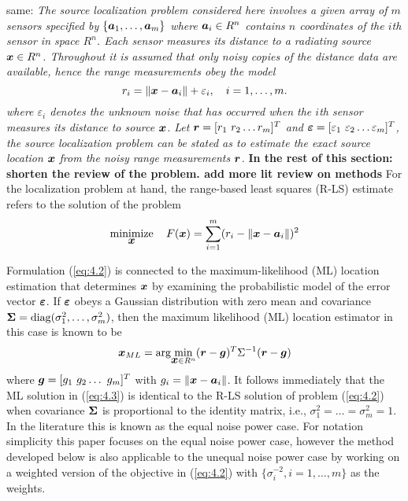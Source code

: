 same:
\emph{The source localization problem considered here involves a given array of $m$ sensors specified by $\{\mbox{\boldmath$a$}_1,\ldots, \mbox{\boldmath$a$}_m\}$ where $\mbox{\boldmath$a$}_i\in R^n$  contains  $n$ coordinates of the $i$th sensor in space $R^n$. Each sensor measures its distance to a radiating source $\mbox{\boldmath$x$}\in R^n$. Throughout it is assumed that only noisy copies of the distance data are available, hence the \textit{range measurements} obey the model
\begin{equation} \label{eq:4.1}
\setcounter{equation}{1}
r_i = \|{\Bx} - {\Ba}_i\| + \varepsilon_i, \quad i = 1, \ldots , m.
\end{equation}    
where $\varepsilon_i$ denotes the unknown noise that has occurred when the $i$th sensor measures its distance to source $\mbox{\boldmath$x$}$. Let $\mbox{\boldmath$r$}=[r_1 \ r_2 \ldots r_m]^T$ and $\mbox{\boldmath${\varepsilon}$}=[\varepsilon_1 \ \varepsilon_2 \ldots \varepsilon_m]^T$, the source localization problem can be stated as to estimate the exact source location $\mbox{\boldmath$x$}$ from the noisy range measurements $\mbox{\boldmath$r$}$. }
\textbf{In the rest of this section: shorten the review of the problem. add more lit review on methods}
For the localization problem at hand, the range-based least squares (R-LS) estimate refers to the solution of the problem
\begin{equation}\label{eq:4.2} %
\Min_{\Bx} \quad F(\Bx)=\sum_{i=1}^{m} (r_i - \|{\Bx} - {\Ba}_i\|)^2
\end{equation}

Formulation (\ref{eq:4.2}) is connected to the maximum-likelihood (ML) location estimation that determines $\mbox{\boldmath$x$}$ by examining the probabilistic model of the error vector $\mbox{\boldmath${\varepsilon}$}$. If $\mbox{\boldmath${\varepsilon}$}$ obeys a Gaussian distribution with zero mean and covariance $\mbox{\boldmath${\Sigma}$} = \mbox{diag}(\sigma_1^2, \ldots, \sigma_m^2)$, then the maximum likelihood (ML) location estimator in this case is known to be
\begin{equation} \label{eq:4.3}%
\Bx_{ML} = \mbox{arg}\!\min_{{\Bx} \in R^n} (\Br - \Bg)^T\Sigma^{-1}(\Br - \Bg)
\end{equation}
where $\mbox{\boldmath$g$} = [g_1 \ g_2 \ldots \ g_m]^T$ with $g_i = \|{\mbox{\boldmath$x$}} - {\mbox{\boldmath$a$}}_i\|$. It follows immediately that the ML solution in (\ref{eq:4.3}) is identical to the R-LS solution of problem (\ref{eq:4.2}) when covariance $\mbox{\boldmath${\Sigma}$}$ is proportional to the identity matrix, i.e., $\sigma_1^2=\ldots =\sigma_m^2 = 1$. In the literature this is known as the equal noise power case. For notation simplicity this paper focuses on the equal noise power case, however the method developed below is also applicable to the unequal noise power case by working on a weighted version of the objective in  (\ref{eq:4.2})  with $\{\sigma_i^{-2}, i = 1, \ldots, m\}$ as the weights.


